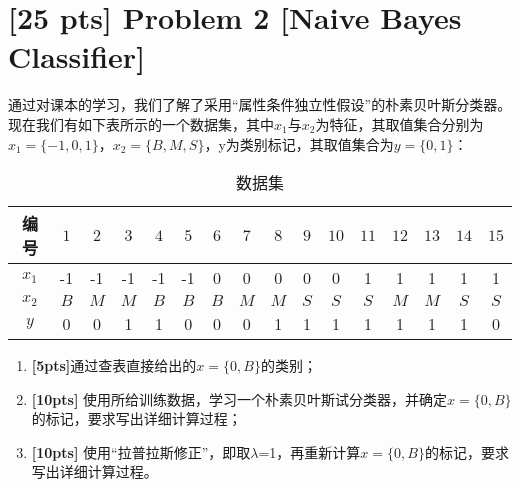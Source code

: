 \documentclass[a4paper,UTF8]{article}
\theoremstyle{definition}
\begin{document}
\section*
{[25 pts] Problem 2 [Naive Bayes Classifier]}
通过对课本的学习，我们了解了采用“属性条件独立性假设”的朴素贝叶斯分类器。现在我们有如下表所示的一个数据集，其中$x_1$与$x_2$为特征，其取值集合分别为$x_1=\{-1,0,1\}$，$x_2=\{B,M,S\}$，y为类别标记，其取值集合为$y=\{0,1\}$：
	\begin{table}[htp]
		\centering
		\caption{数据集}\label{tab:aStrangeTable}
	\begin{tabular}{cccccccccccccccc}
		\hline 
	编号	& $1$ & $2$ & $3$ & $4$ & $5$ & $6$ & $7$ & $8$ & $9$ & $10$ & $11$ & $12$ & $13$ & $14$ & $15$\\ 
		\hline 
	$x_1$	& -1 & -1 & -1 & -1 & -1 & 0 & 0 & 0 & 0 & 0 & 1 & 1 & 1 & 1 & 1 \\ 
		\hline 
	$x_2$	& $B$ &$M$ &$M$ &$B$ &$B$ &$B$ &$M$ &$M$ &$S$ &$S$ &$S$ &$M$ &$M$ &$S$ &$S$  \\ 
		\hline 
	$y$	& 0 & 0 & 1 & 1 & 0 & 0 & 0 & 1 & 1 & 1 & 1 & 1 & 1 & 1 & 0 \\ 
		\hline 
	\end{tabular}
	\end{table} 
	
	\begin{enumerate}[(1)]
	    \item \textbf{[5pts]}通过查表直接给出的$x=\{0,B\}$的类别；
		\item \textbf{[10pts]} 使用所给训练数据，学习一个朴素贝叶斯试分类器，并确定$x=\{0,B\}$的标记，要求写出详细计算过程；
		\item \textbf{[10pts]} 使用“拉普拉斯修正”，即取$\lambda$=1，再重新计算$x=\{0,B\}$的标记，要求写出详细计算过程。
	\end{enumerate}
	
\end{document}
